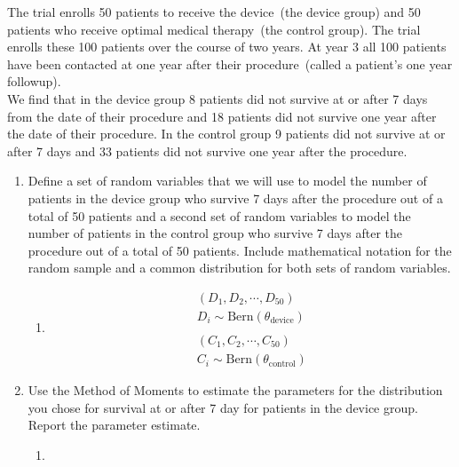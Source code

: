 \documentclass[krantz1,ChapterTOCs]{krantz}
\begin{document}
\begin{enumerate}
    The trial enrolls 50 patients to receive the device~(the device group) and 50 patients who receive optimal medical therapy~(the control group). The trial enrolls these 100 patients over the course of two years. At year 3 all 100 patients have been contacted at one year after their procedure~(called a patient's one year followup).\\
    
    We find that in the device group 8 patients did not survive at or after 7 days from the date of their procedure and 18 patients did not survive one year after the date of their procedure. In the control group 9 patients did not survive at or after 7 days and 33 patients did not survive one year after the procedure.
    
    \begin{enumerate}
        \item Define a set of random variables that we will use to model the number of patients in the device group who survive 7 days after the procedure out of a total of 50 patients and a second set of random variables to model the number of patients in the control group who survive 7 days after the procedure out of a total of 50 patients. Include mathematical notation for the random sample and a common distribution for both sets of random variables. 
        \begin{enumerate}
            \item {
            \color{red} 
                \begin{align}
                    (D_{1},D_{2},\cdots, D_{50}) \\
                    D_{i} \sim \text{Bern}(\theta_{\text{device}})\\
                    \nonumber\\
                    (C_{1},C_{2},\cdots, C_{50}) \\
                    C_{i} \sim \text{Bern}(\theta_{\text{control}})
                \end{align}
            } 
        \end{enumerate}

        
        \item Use the Method of Moments to estimate the parameters for the distribution you chose for survival at or after 7 day for patients in the device group. Report the parameter estimate. 
        \begin{enumerate}
            \item {
            \color{red} 
        
}
\end{enumerate}
\end{enumerate}
\end{enumerate}
\end{document}

